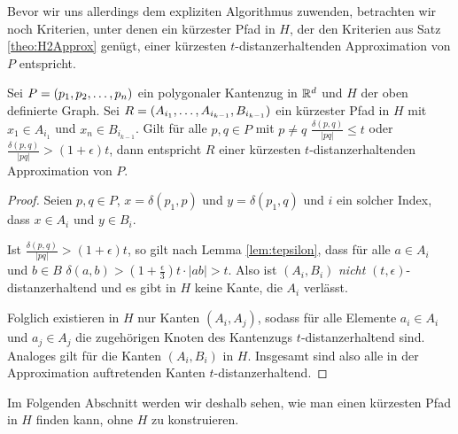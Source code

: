     Bevor wir uns allerdings dem expliziten Algorithmus zuwenden, betrachten wir noch Kriterien, unter denen ein kürzester Pfad in $H$, der den Kriterien aus Satz \ref{theo:H2Approx} genügt, einer kürzesten $t$-distanzerhaltenden Approximation von $P$ entspricht.
    
    \begin{theorem}
    	\label{theo:tcriteria}
    	Sei $P = (p_1, p_2, \mathellipsis, p_n)$ ein polygonaler Kantenzug in $\mathbb{R}^d$ und $H$ der oben definierte Graph. Sei $R = (A_{i_1}, \mathellipsis, A_{i_{k-1}}, B_{i_{k-1}})$ ein kürzester Pfad in $H$ mit $x_1 \in A_{i_1}$ und $x_n \in B_{i_{k-1}}$. Gilt für alle $p, q \in P$ mit $p \neq q$ $\frac{\delta(p, q)}{|pq|} \leq t$ oder $\frac{\delta(p, q)}{|pq|} > (1+\epsilon)t$, dann entspricht $R$ einer kürzesten $t$-distanzerhaltenden Approximation von $P$.
    \end{theorem}
    
    \begin{proof}
    	Seien $p, q \in P$, $x = \delta(p_1, p)$ und $y = \delta(p_1, q)$ und $i$ ein solcher Index, dass $x \in A_i$ und $y \in B_i$. 
    	
    	Ist $\frac{\delta(p, q)}{|pq|} > (1+\epsilon)t$, so gilt nach Lemma \ref{lem:tepsilon}, dass für alle $a \in A_i$ und $b \in B$ $\delta(a, b) > (1 + \frac{\epsilon}{3})t \cdot |ab| > t$. 
    	Also ist $(A_i, B_i)$ \emph{nicht} $(t, \epsilon)$-distanzerhaltend und es gibt in $H$ keine Kante, die $A_i$ verlässt. 
    	
    	Folglich existieren in $H$ nur Kanten $(A_i, A_j)$, sodass für alle Elemente $a_i \in A_i$ und $a_j \in A_j$ die zugehörigen Knoten des Kantenzugs $t$-distanzerhaltend sind.
    	Analoges gilt für die Kanten $(A_i, B_i)$ in $H$.
    	Insgesamt sind also alle in der Approximation auftretenden Kanten $t$-distanzerhaltend.
    	
    \end{proof}
    
    Im Folgenden Abschnitt werden wir deshalb sehen, wie man einen kürzesten Pfad in $H$ finden kann, ohne $H$ zu konstruieren.
    
